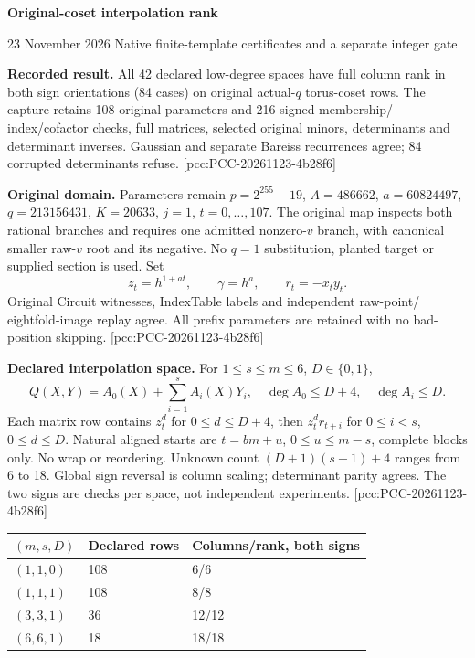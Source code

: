 \documentclass[10pt]{article}
\begin{document}
{\Large\bfseries\color{ink} Original-coset interpolation rank}\par
{\small 23 November 2026 \quad Native finite-template certificates and a separate integer gate}

\textbf{Recorded result.} All 42 declared low-degree spaces have full column
rank in both sign orientations (84 cases) on original actual-$q$ torus-coset
rows. The capture retains 108 original parameters and 216 signed membership/
index/cofactor checks, full matrices, selected original minors, determinants
and determinant inverses. Gaussian and separate Bareiss recurrences agree;
84 corrupted determinants refuse. [pcc:PCC-20261123-4b28f6]

\textbf{Original domain.} Parameters remain $p=2^{255}-19$, $A=486662$,
$a=60824497$, $q=213156431$, $K=20633$, $j=1$, $t=0,\ldots,107$.
The original map inspects both rational branches and requires one admitted
nonzero-$v$ branch, with canonical smaller raw-$v$ root and its negative.
No $q=1$ substitution, planted target or supplied section is used. Set
\[
 z_t=h^{1+at},\qquad\gamma=h^a,\qquad r_t=-x_ty_t.
\]
Original Circuit witnesses, IndexTable labels and independent raw-point/
eightfold-image replay agree. All prefix parameters are retained with no
bad-position skipping. [pcc:PCC-20261123-4b28f6]

\textbf{Declared interpolation space.} For $1\le s\le m\le6$, $D\in\{0,1\}$,
\[
 Q(X,Y)=A_0(X)+\sum_{i=1}^s A_i(X)Y_i,
 \quad \deg A_0\le D+4,\quad\deg A_i\le D.
\]
Each matrix row contains $z_t^d$ for $0\le d\le D+4$, then
$z_t^d r_{t+i}$ for $0\le i<s$, $0\le d\le D$. Natural aligned starts are
$t=bm+u$, $0\le u\le m-s$, complete blocks only. No wrap or reordering.
Unknown count $(D+1)(s+1)+4$ ranges from 6 to 18. Global sign reversal is
column scaling; determinant parity agrees. The two signs are checks per
space, not independent experiments. [pcc:PCC-20261123-4b28f6]

\begin{center}\begin{tabular}{lll}\toprule
$(m,s,D)$ & Declared rows & Columns/rank, both signs\\\midrule
$(1,1,0)$&108&6/6\\
$(1,1,1)$&108&8/8\\
$(3,3,1)$&36&12/12\\
$(6,6,1)$&18&18/18\\\bottomrule
\end{tabular}\end{center}
\end{document}
